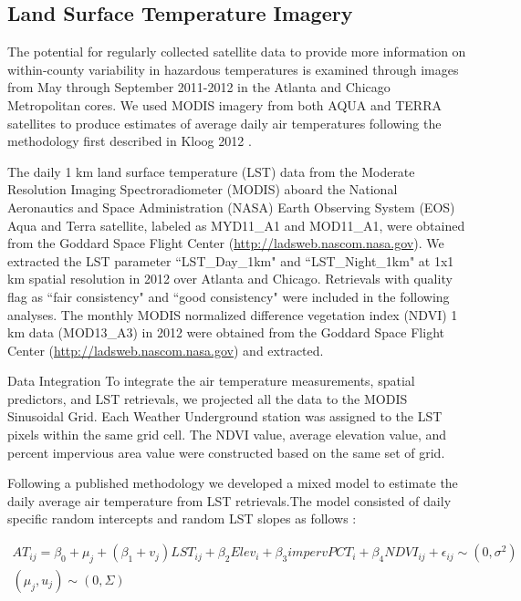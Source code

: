 \documentclass{ametsoc}
\begin{document}
\subsection{Land Surface Temperature Imagery}\label{subsec:MODISdata}
The potential for regularly collected satellite data to provide more information on within-county variability in hazardous temperatures is examined through images from May through September 2011-2012 in the Atlanta and Chicago Metropolitan cores.  We used MODIS imagery from both AQUA and TERRA satellites to produce estimates of average daily air temperatures following the methodology first described in Kloog 2012 \cite{kloog2012}.

The daily 1 km land surface temperature (LST) data from the Moderate Resolution Imaging Spectroradiometer (MODIS) aboard the National Aeronautics and Space Administration (NASA) Earth Observing System (EOS) Aqua and Terra satellite, labeled as MYD11\_A1 and MOD11\_A1, were obtained from the Goddard Space Flight Center (\url{http://ladsweb.nascom.nasa.gov}). We extracted the LST parameter ``LST\_Day\_1km" and ``LST\_Night\_1km" at 1x1 km spatial resolution in 2012 over Atlanta and Chicago. Retrievals with quality flag as ``fair consistency" and ``good consistency" were included in the following analyses. The monthly MODIS normalized difference vegetation index (NDVI) 1 km data (MOD13\_A3) in 2012 were obtained from the Goddard Space Flight Center (\url{http://ladsweb.nascom.nasa.gov}) and extracted. 

Data Integration
To integrate the air temperature measurements, spatial predictors, and LST retrievals, we projected all the data to the MODIS Sinusoidal Grid. Each Weather Underground station was assigned to the LST pixels within the same grid cell. The NDVI value, average elevation value, and percent impervious area value were constructed based on the same set of grid. 


Following a published methodology \cite{kloog2012} we developed a mixed model to estimate the daily average air temperature from LST retrievals.The model consisted of daily specific random intercepts and random LST slopes as follows :

\begin{equation}
\begin{split}
AT_{ij} = \beta_0 + \mu_j + (\beta_1 + v_j)LST_{ij} + \beta_2Elev_i + \beta_3impervPCT_i + \beta_4NDVI_{ij} + \epsilon_{ij}  \sim (0,\sigma^2) \\ 
(\mu_j, u_j) \sim (0,\Sigma)
\end{split}
\label{eq:model}
\end{equation}
\end{document}
